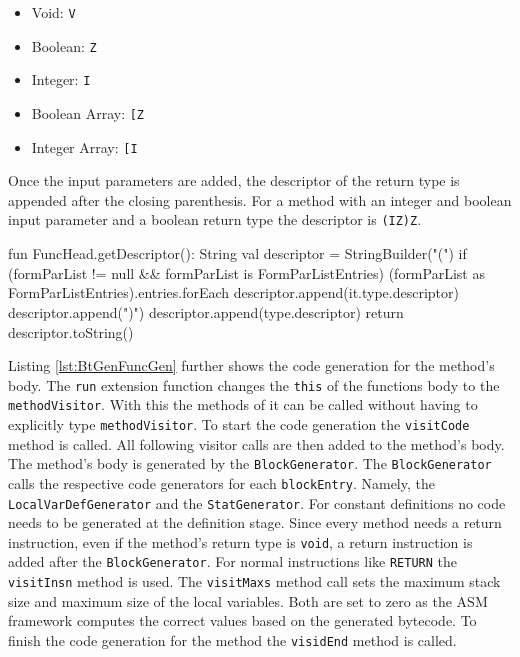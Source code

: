 \begin{itemize}
    \item Void:           \verb|V|
    \item Boolean:        \verb|Z|
    \item Integer:        \verb|I|
    \item Boolean Array: \verb|[Z|
    \item Integer Array: \verb|[I|
\end{itemize}

Once the input parameters are added, the descriptor of the return type is appended after the closing parenthesis. For a method with an integer and boolean input parameter and a boolean return type the descriptor is \verb|(IZ)Z|.


\begin{KotlinCode}[float,numbers=none,caption=Generation of the descriptor of a method., label=lst:BtGenFuncGenDesc]
fun FuncHead.getDescriptor(): String {
    val descriptor = StringBuilder("(")
    if (formParList != null && formParList is FormParListEntries) {
        (formParList as FormParListEntries).entries.forEach {
            descriptor.append(it.type.descriptor)
        }
    }
    descriptor.append(")")
    descriptor.append(type.descriptor)
    return descriptor.toString()
}
\end{KotlinCode}

Listing \ref{lst:BtGenFuncGen} further shows the code generation for the method's body. The \verb|run| extension function changes the \verb|this| of the functions body to the \verb|methodVisitor|. With this the methods of it can be called without having to explicitly type \verb|methodVisitor|. To start the code generation the \verb|visitCode| method is called. All following visitor calls are then added to the method's body. The method's body is generated by the \verb|BlockGenerator|. The \verb|BlockGenerator| calls the respective code generators for each \verb|blockEntry|. Namely, the \verb|LocalVarDefGenerator| and the \verb|StatGenerator|. For constant definitions no code needs to be generated at the definition stage. Since every method needs a return instruction, even if the method's return type is \verb|void|, a return instruction is added after the \verb|BlockGenerator|. For normal instructions like \verb|RETURN| the \verb|visitInsn| method is used. The \verb|visitMaxs| method call sets the maximum stack size and maximum size of the local variables. Both are set to zero as the ASM framework computes the correct values based on the generated bytecode. To finish the code generation for the method the \verb|visidEnd| method is called.  

